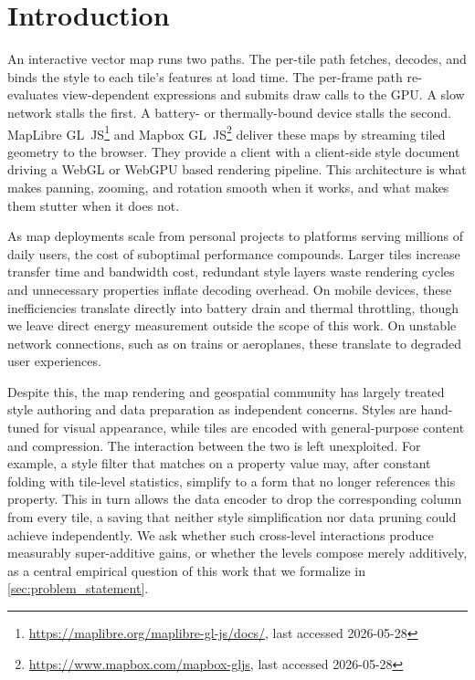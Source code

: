 \chapter{Introduction}\label{ch:introduction}

An interactive vector map runs two paths.
The per-tile path fetches, decodes, and binds the style to each tile's features at load time.
The per-frame path re-evaluates view-dependent expressions and submits draw calls to the \ac{GPU}.
A slow network stalls the first.
A battery- or thermally-bound device stalls the second.
MapLibre GL~JS\footnote{\url{https://maplibre.org/maplibre-gl-js/docs/}, last accessed 2026-05-28} and Mapbox GL~JS\footnote{\url{https://www.mapbox.com/mapbox-gljs}, last accessed 2026-05-28} deliver these maps by streaming tiled geometry to the browser.
They provide a client with a client-side style document driving a \ac{WebGL} or \ac{WebGPU} based rendering pipeline.
This architecture is what makes panning, zooming, and rotation smooth when it works, and what makes them stutter when it does not.

As map deployments scale from personal projects to platforms serving millions of daily users, the cost of suboptimal performance compounds.
Larger tiles increase transfer time and bandwidth cost, redundant style layers waste rendering cycles and unnecessary properties inflate decoding overhead.
On mobile devices, these inefficiencies translate directly into battery drain and thermal throttling, though we leave direct energy measurement outside the scope of this work.
On unstable network connections, such as on trains or aeroplanes, these translate to degraded user experiences.

Despite this, the map rendering and geospatial community has largely treated style authoring and data preparation as independent concerns.
Styles are hand-tuned for visual appearance, while tiles are encoded with general-purpose content and compression.
The interaction between the two is left unexploited.
For example, a style filter that matches on a property value may, after constant folding with tile-level statistics, simplify to a form that no longer references this property.
This in turn allows the data encoder to drop the corresponding column from every tile, a saving that neither style simplification nor data pruning could achieve independently.
We ask whether such cross-level interactions produce measurably super-additive gains, or whether the levels compose merely additively, as a central empirical question of this work that we formalize in \cref{sec:problem_statement}.

